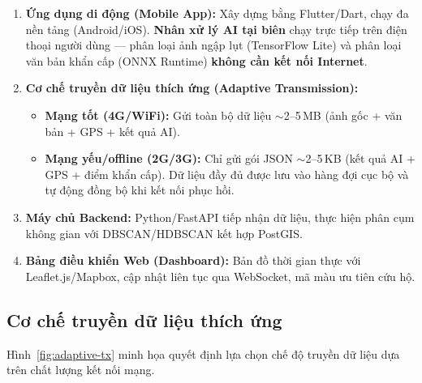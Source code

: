 \documentclass[12pt, a4paper]{report}
\newcommand{\keyword}[1]{\textbf{#1}}
\begin{document}
\begin{enumerate}
  \item \textbf{Ứng dụng di động (Mobile App):} Xây dựng bằng Flutter/Dart, chạy đa nền tảng (Android/iOS). \keyword{Nhân xử lý AI tại biên} chạy trực tiếp trên điện thoại người dùng — phân loại ảnh ngập lụt (TensorFlow Lite) và phân loại văn bản khẩn cấp (ONNX Runtime) \textbf{không cần kết nối Internet}.

  \item \textbf{Cơ chế truyền dữ liệu thích ứng (Adaptive Transmission):}
  \begin{itemize}
    \item \textbf{Mạng tốt (4G/WiFi):} Gửi toàn bộ dữ liệu $\sim$2--5\,MB (ảnh gốc + văn bản + GPS + kết quả AI).
    \item \textbf{Mạng yếu/offline (2G/3G):} Chỉ gửi gói JSON $\sim$2--5\,KB (kết quả AI + GPS + điểm khẩn cấp). Dữ liệu đầy đủ được lưu vào hàng đợi cục bộ và tự động đồng bộ khi kết nối phục hồi.
  \end{itemize}

  \item \textbf{Máy chủ Backend:} Python/FastAPI tiếp nhận dữ liệu, thực hiện phân cụm không gian với DBSCAN/HDBSCAN kết hợp PostGIS.

  \item \textbf{Bảng điều khiển Web (Dashboard):} Bản đồ thời gian thực với Leaflet.js/Mapbox, cập nhật liên tục qua WebSocket, mã màu ưu tiên cứu hộ.
\end{enumerate}

\subsection{Cơ chế truyền dữ liệu thích ứng}

Hình~\ref{fig:adaptive-tx} minh họa quyết định lựa chọn chế độ truyền dữ liệu dựa trên chất lượng kết nối mạng.
\end{document}
